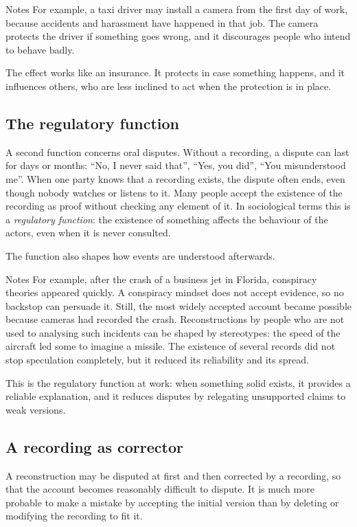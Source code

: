 \begin{nota}{Notes}
	For example, a taxi driver may install a camera from the first day of work, because accidents and harassment have happened in that job. The camera protects the driver if something goes wrong, and it discourages people who intend to behave badly.
\end{nota}

The effect works like an insurance. It protects in case something happens, and it influences others, who are less inclined to act when the protection is in place.

\subsection{The regulatory function}
A second function concerns oral disputes. Without a recording, a dispute can last for days or months: ``No, I never said that'', ``Yes, you did'', ``You misunderstood me''. When one party knows that a recording exists, the dispute often ends, even though nobody watches or listens to it. Many people accept the existence of the recording as proof without checking any element of it. In sociological terms this is a \emph{regulatory function}: the existence of something affects the behaviour of the actors, even when it is never consulted.

The function also shapes how events are understood afterwards.

\begin{nota}{Notes}
	For example, after the crash of a business jet in Florida, conspiracy theories appeared quickly. A conspiracy mindset does not accept evidence, so no backstop can persuade it. Still, the most widely accepted account became possible because cameras had recorded the crash. Reconstructions by people who are not used to analysing such incidents can be shaped by stereotypes: the speed of the aircraft led some to imagine a missile. The existence of several records did not stop speculation completely, but it reduced its reliability and its spread.
\end{nota}

This is the regulatory function at work: when something solid exists, it provides a reliable explanation, and it reduces disputes by relegating unsupported claims to weak versions.

\subsection{A recording as corrector}
A reconstruction may be disputed at first and then corrected by a recording, so that the account becomes reasonably difficult to dispute. It is much more probable to make a mistake by accepting the initial version than by deleting or modifying the recording to fit it.

